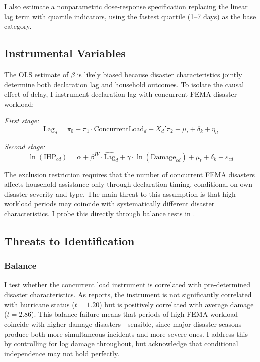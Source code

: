 \documentclass[12pt]{article}
\begin{document}
I also estimate a nonparametric dose-response specification replacing the linear lag term with quartile indicators, using the fastest quartile (1--7 days) as the base category.

\subsection{Instrumental Variables}

The OLS estimate of $\beta$ is likely biased because disaster characteristics jointly determine both declaration lag and household outcomes. To isolate the causal effect of delay, I instrument declaration lag with concurrent FEMA disaster workload:

\textit{First stage:}
\begin{equation}
\text{Lag}_d = \pi_0 + \pi_1 \cdot \text{ConcurrentLoad}_d + X_d'\pi_2 + \mu_t + \delta_k + \eta_d
\label{eq:fs}
\end{equation}

\textit{Second stage:}
\begin{equation}
\ln(\text{IHP}_{cd}) = \alpha + \beta^{IV} \cdot \widehat{\text{Lag}}_d + \gamma \cdot \ln(\text{Damage}_{cd}) + \mu_t + \delta_k + \varepsilon_{cd}
\label{eq:iv}
\end{equation}

The exclusion restriction requires that the number of concurrent FEMA disasters affects household assistance only through declaration timing, conditional on own-disaster severity and type. The main threat to this assumption is that high-workload periods may coincide with systematically different disaster characteristics. I probe this directly through balance tests in .

\subsection{Threats to Identification}

\subsubsection*{Balance} I test whether the concurrent load instrument is correlated with pre-determined disaster characteristics. As  reports, the instrument is not significantly correlated with hurricane status ($t = 1.20$) but is positively correlated with average damage ($t = 2.86$). This balance failure means that periods of high FEMA workload coincide with higher-damage disasters---sensible, since major disaster seasons produce both more simultaneous incidents and more severe ones. I address this by controlling for log damage throughout, but acknowledge that conditional independence may not hold perfectly.
\end{document}
